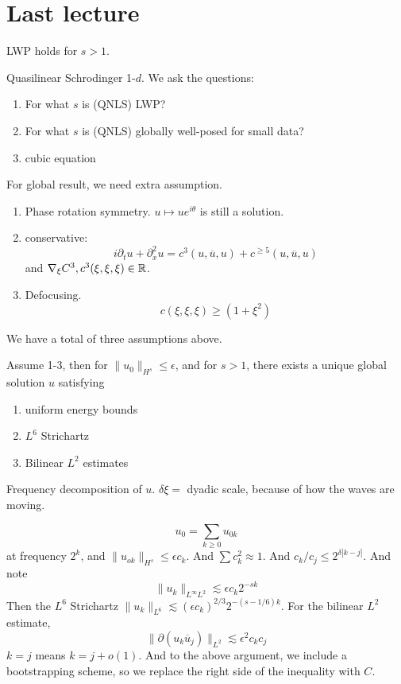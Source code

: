 \section{Last lecture}
\begin{theorem}[I-T]
    LWP holds for $s>1$.
\end{theorem}
Quasilinear Schrodinger 1-$d$. We ask the questions:
\begin{enumerate}
    \item For what $s$ is (QNLS) LWP?
    \item For what $s$ is (QNLS) globally well-posed for small data?
    \item cubic equation
\end{enumerate}
For global result, we need extra assumption.
\begin{enumerate}
    \item Phase rotation symmetry. $u\mapsto ue^{i\theta}$ is still a solution.
    \item conservative: 
    \begin{equation*}
        i\partial_tu+\partial_x^2u=c^3(u,\overline{u}, u)+c^{\geq 5}(u, \overline{u}, u)
    \end{equation*}
    and $\nabla_\xi C^3, c^3(\xi, \xi, \xi)\in\mathbb{R}$. 
    \item Defocusing. 
    \begin{equation*}
        c(\xi, \xi, \xi)\geq(1+\xi^2)
    \end{equation*}
\end{enumerate}
We have a total of three assumptions above.
\begin{theorem}
    Assume 1-3, then for $\|u_0\|_{H^s}\leq\epsilon$, and for $s>1$, there exists a unique global solution $u$ satisfying
    \begin{enumerate}
        \item uniform energy bounds
        \item $L^6$ Strichartz
        \item Bilinear $L^2$ estimates
    \end{enumerate}
\end{theorem} 
Frequency decomposition of $u$. $\delta\xi=$ dyadic scale, because of how the waves are moving.

\begin{equation*}
    u_0=\sum_{k\geq 0}u_{0k}
\end{equation*}
at frequency $2^k$, and $\|u_{ok}\|_{H^s}\leq\epsilon c_k$. And $\sum c_k^2\approx 1$. And $c_k/c_j\leq 2^{\delta|k-j|}$. 
And note
\begin{equation*}
    \|u_k\|_{L^\infty L^2}\lesssim\epsilon c_k 2^{-sk}
\end{equation*}
Then the $L^6$ Strichartz $\|u_k\|_{L^6}\lesssim (\epsilon c_k)^{2/3}2^{-(s-1/6)k}$.
For the bilinear $L^2$ estimate, 
\begin{equation*}
    \|\partial(u_k\overline{u}_j)\|_{L^2}\lesssim\epsilon^2 c_kc_j
\end{equation*}
$k=j$ means $k=j+o(1)$. And to the above argument, we include a bootstrapping scheme, so we replace the right side of the inequality with $C$.


